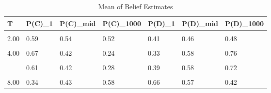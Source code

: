 \begin{table}[!h]
\centering
\caption{Mean of Belief Estimates}
\centering
\begin{tabular}[t]{lllllll}
\toprule
T & P(C)\_1 & P(C)\_mid & P(C)\_1000 & P(D)\_1 & P(D)\_mid & P(D)\_1000\\
\midrule
\cellcolor{gray!10}{1.00} & \cellcolor{gray!10}{0.75} & \cellcolor{gray!10}{0.37} & \cellcolor{gray!10}{0.36} & \cellcolor{gray!10}{0.25} & \cellcolor{gray!10}{0.63} & \cellcolor{gray!10}{0.64}\\
2.00 & 0.59 & 0.54 & 0.52 & 0.41 & 0.46 & 0.48\\
\cellcolor{gray!10}{3.00} & \cellcolor{gray!10}{0.58} & \cellcolor{gray!10}{0.30} & \cellcolor{gray!10}{0.29} & \cellcolor{gray!10}{0.42} & \cellcolor{gray!10}{0.70} & \cellcolor{gray!10}{0.71}\\
4.00 & 0.67 & 0.42 & 0.24 & 0.33 & 0.58 & 0.76\\
\cellcolor{gray!10}{5.00} & \cellcolor{gray!10}{0.62} & \cellcolor{gray!10}{0.36} & \cellcolor{gray!10}{0.19} & \cellcolor{gray!10}{0.38} & \cellcolor{gray!10}{0.64} & \cellcolor{gray!10}{0.81}\\
\addlinespace
6.00 & 0.61 & 0.42 & 0.28 & 0.39 & 0.58 & 0.72\\
\cellcolor{gray!10}{7.00} & \cellcolor{gray!10}{0.44} & \cellcolor{gray!10}{0.48} & \cellcolor{gray!10}{0.66} & \cellcolor{gray!10}{0.56} & \cellcolor{gray!10}{0.52} & \cellcolor{gray!10}{0.34}\\
8.00 & 0.34 & 0.43 & 0.58 & 0.66 & 0.57 & 0.42\\
\bottomrule
\end{tabular}
\end{table}